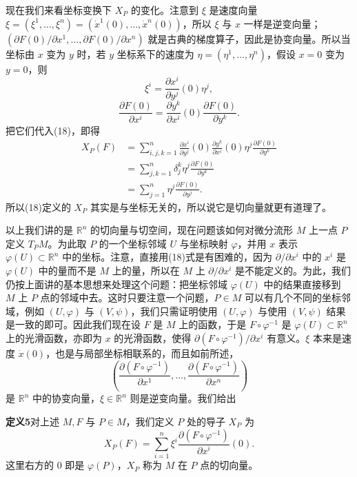现在我们来看坐标变换下 $X_P$ 的变化。注意到 $\xi$ 是速度向量 $\xi=(\xi^1,\ldots,\xi^n)=(\dot x^1(0),\ldots,\dot x^n(0))$，所以 $\xi$ 与 $x$ 一样是逆变向量；$(\partial F(0)/\partial x^1,\ldots,\partial F(0)/\partial x^n)$ 就是古典的梯度算子，因此是协变向量。所以当坐标由 $x$ 变为 $y$ 时，若 $y$ 坐标系下的速度为 $\eta=(\eta^1,\ldots,\eta^n)$，假设 $x=0$ 变为 $y=0$，则
\[
 \xi^i=\frac{\partial x^i}{\partial y^j}(0)\eta^j,
\]
\[
 \frac{\partial F(0)}{\partial x^i}
 =\frac{\partial y^k}{\partial x^i}(0)
 \frac{\partial F(0)}{\partial y^k}.
\]
把它们代入(18)，即得
\[
 \begin{aligned}
 X_P(F)
 &=\sum_{i,j,k=1}^n
 \frac{\partial x^i}{\partial y^j}(0)
 \frac{\partial y^k}{\partial x^i}(0)
 \eta^j\frac{\partial F(0)}{\partial y^k}\\
 &=\sum_{j,k=1}^n\delta_j^k\eta^j\frac{\partial F(0)}{\partial y^k}\\
 &=\sum_{j=1}^n\eta^j\frac{\partial F(0)}{\partial y^j}.
 \end{aligned}
\]
所以(18)定义的 $X_P$ 其实是与坐标无关的，所以说它是切向量就更有道理了。

以上我们讲的是 $\mathbb R^n$ 的切向量与切空间，现在问题该如何对微分流形 $M$ 上一点 $P$ 定义 $T_PM$。为此取 $P$ 的一个坐标邻域 $U$ 与坐标映射 $\varphi$，并用 $x$ 表示 $\varphi(U)\subset\mathbb R^n$ 中的坐标。注意，直接用(18)式是有困难的，因为 $\partial/\partial x^i$ 中的 $x^i$ 是 $\varphi(U)$ 中的量而不是 $M$ 上的量，所以在 $M$ 上 $\partial/\partial x^i$ 是不能定义的。为此，我们仍按上面讲的基本思想来处理这个问题：把坐标邻域 $\varphi(U)$ 中的结果直接移到 $M$ 上 $P$ 点的邻域中去。这时只要注意一个问题，$P\in M$ 可以有几个不同的坐标邻域，例如 $(U,\varphi)$ 与 $(V,\psi)$，我们只需证明使用 $(U,\varphi)$ 与使用 $(V,\psi)$ 结果是一致的即可。因此我们现在设 $F$ 是 $M$ 上的函数，于是 $F\circ\varphi^{-1}$ 是 $\varphi(U)\subset\mathbb R^n$ 上的光滑函数，亦即为 $x$ 的光滑函数，使得 $\partial(F\circ\varphi^{-1})/\partial x^i$ 有意义。$\xi$ 本来是速度 $\dot x(0)$，也是与局部坐标相联系的，而且如前所述，
\[
 \left(\frac{\partial(F\circ\varphi^{-1})}{\partial x^1},\ldots,
 \frac{\partial(F\circ\varphi^{-1})}{\partial x^n}\right)
\]
是 $\mathbb R^n$ 中的协变向量，$\xi\in\mathbb R^n$ 则是逆变向量。我们给出

\noindent\textbf{定义5}\quad 对上述 $M,F$ 与 $P\in M$，我们定义 $P$ 处的导子 $X_P$ 为
\begin{equation}
 X_P(F)=\sum_{i=1}^n\xi^i
 \frac{\partial(F\circ\varphi^{-1})}{\partial x^i}(0).
 \tag{20}
\end{equation}
这里右方的 $0$ 即是 $\varphi(P)$，$X_P$ 称为 $M$ 在 $P$ 点的切向量。

